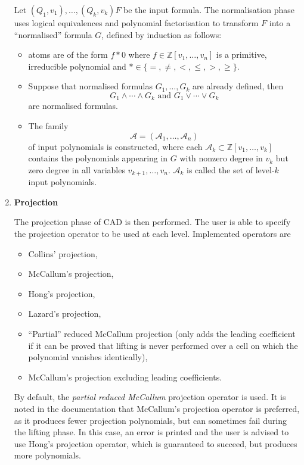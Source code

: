\documentclass[
]{book}
\providecommand{\tightlist}{%
  \setlength{\itemsep}{0pt}\setlength{\parskip}{0pt}}
\theoremstyle{definition}
\theoremstyle{definition}
\theoremstyle{definition}
\theoremstyle{definition}
\theoremstyle{remark}
\begin{document}
\begin{enumerate}
  Let \((Q_1,v_1),\ldots,(Q_k,v_k) F\) be the input formula. The normalisation phase uses logical equivalences and polynomial factorisation to transform \(F\) into a ``normalised'' formula \(G\), defined by induction as follows:

  \begin{itemize}
  \tightlist
  \item
    atoms are of the form \(f \ast 0\) where \(f \in \mathbb{Z}[v_1,\ldots,v_n]\) is a primitive, irreducible polynomial and \(\ast \in \{=, \ne, <, \le, >, \ge \}\).
  \item
    Suppose that normalised formulas \(G_1,\ldots,G_k\) are already defined, then
    \[
     G_1 \land \cdots \land G_k \text{ and } G_1 \lor \cdots \lor G_k
     \]
    are normalised formulas.
  \item
    The family
    \[
     \mathcal{A} = (\mathcal{A}_1, \ldots,\mathcal{A}_n)
     \] of input polynomials is constructed, where each \(\mathcal{A}_k \subset \mathbb{Z}[v_1,\ldots,v_k]\) contains the polynomials appearing in \(G\) with nonzero degree in \(v_k\) but zero degree in all variables \(v_{k+1},\ldots,v_n\).
    \(\mathcal{A}_k\) is called the set of level-\(k\) input polynomials.
  \end{itemize}
\item
  \textbf{Projection}

  The projection phase of CAD is then performed. The user is able to specify the projection operator to be used at each level. Implemented operators are

  \begin{itemize}
  \tightlist
  \item
    Collins' projection,
  \item
    McCallum's projection,
  \item
    Hong's projection,
  \item
    Lazard's projection,
  \item
    ``Partial'' reduced McCallum projection
    (only adds the leading coefficient if it can be proved that lifting is never performed over a cell on which the polynomial vanishes identically),
  \item
    McCallum's projection excluding leading coefficients.
  \end{itemize}

  By default, the \emph{partial reduced McCallum} projection operator is used. It is noted in the documentation that McCallum's projection operator is preferred, as it produces fewer projection polynomials, but can sometimes fail during the lifting phase. In this case, an error is printed and the user is advised to use Hong's projection operator, which is guaranteed to succeed, but produces more polynomials.


\end{enumerate}
\end{document}
